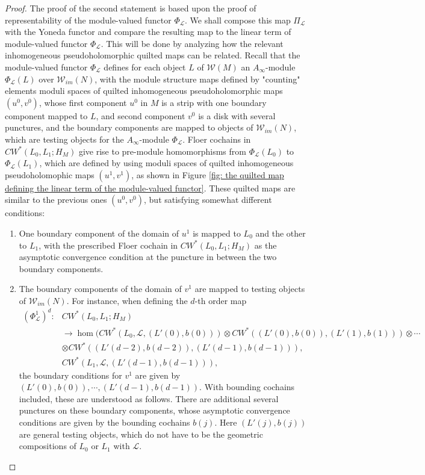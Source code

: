\documentclass{amsart}
\numberwithin{equation}{section}
\numberwithin{figure}{section}
\begin{document}
\begin{proof}
	The proof of the second statement is based upon the proof of representability of the module-valued functor $\Phi_{\mathcal{L}}$. We shall compose this map $\Pi_{\mathcal{L}}$ with the Yoneda functor and compare the resulting map to the linear term of module-valued functor $\Phi_{\mathcal{L}}$. This will be done by analyzing how the relevant inhomogeneous pseudoholomorphic quilted maps can be related. Recall that the module-valued functor $\Phi_{\mathcal{L}}$ defines for each object $L$ of $\mathcal{W}(M)$ an $A_{\infty}$-module $\Phi_{\mathcal{L}}(L)$ over $\mathcal{W}_{im}(N)$, with the module structure maps defined by "counting" elements moduli spaces of quilted inhomogeneous pseudoholomorphic maps $(u^{0}, v^{0})$, whose first component $u^{0}$ in $M$ is a strip with one boundary component mapped to $L$, and second component $v^{0}$ is a disk with several punctures, and the boundary components are mapped to objects of $\mathcal{W}_{im}(N)$, which are testing objects for the $A_{\infty}$-module $\Phi_{\mathcal{L}}$. Floer cochains in $CW^{*}(L_{0}, L_{1}; H_{M})$ give rise to pre-module homomorphisms from $\Phi_{\mathcal{L}}(L_{0})$ to $\Phi_{\mathcal{L}}(L_{1})$, which are defined by using moduli spaces of quilted inhomogeneous pseudoholomophic maps $(u^{1}, v^{1})$, as shown in Figure \ref{fig: the quilted map defining the linear term of the module-valued functor}. These quilted maps are similar to the previous ones $(u^{0}, v^{0})$, but satisfying somewhat different conditions:
\begin{enumerate}[label=(\roman*)]

\item One boundary component of the domain of $u^{1}$ is mapped to $L_{0}$ and the other to $L_{1}$, with the prescribed Floer cochain in $CW^{*}(L_{0}, L_{1}; H_{M})$ as the asymptotic convergence condition at the puncture in between the two boundary components.

\item The boundary components of the domain of $v^{1}$ are mapped to testing objects of $\mathcal{W}_{im}(N)$. For instance, when defining the $d$-th order map
\begin{equation}
\begin{split}
(\Phi^{1}_{\mathcal{L}})^{d}: & CW^{*}(L_{0}, L_{1}; H_{M})\\
& \to \hom(CW^{*}(L_{0}, \mathcal{L}, (L'(0), b(0))) \otimes CW^{*}((L'(0), b(0)), (L'(1), b(1))) \otimes \cdots \\
& \otimes CW^{*}((L'(d-2), b(d-2)), (L'(d-1), b(d-1))),\\
& CW^{*}(L_{1}, \mathcal{L}, (L'(d-1), b(d-1))),
\end{split}
\end{equation}
the boundary conditions for $v^{1}$ are given by $(L'(0), b(0)), \cdots, (L'(d-1), b(d-1))$. With bounding cochains included, these are understood as follows. There are additional several punctures on these boundary components, whose asymptotic convergence conditions are given by the bounding cochains $b(j)$.
Here $(L'(j), b(j))$ are general testing objects, which do not have to be the geometric compositions of $L_{0}$ or $L_{1}$ with $\mathcal{L}$.


\end{enumerate}
\end{proof}
\end{document}
